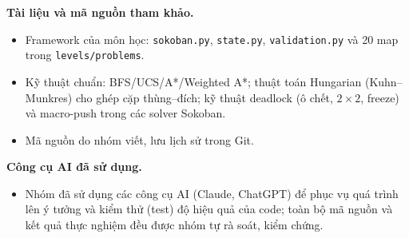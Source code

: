 \documentclass[a4paper,12pt]{article}
\begin{document}
\textbf{Tài liệu và mã nguồn tham khảo.}
\begin{itemize}
    \item Framework của môn học: \texttt{sokoban.py}, \texttt{state.py}, \texttt{validation.py} và 20 map trong \texttt{levels/problems}.
    \item Kỹ thuật chuẩn: BFS/UCS/A*/Weighted A*; thuật toán Hungarian (Kuhn--Munkres) cho ghép cặp thùng--đích; kỹ thuật deadlock (ô chết, $2\times 2$, freeze) và macro-push trong các solver Sokoban.
    \item Mã nguồn do nhóm viết, lưu lịch sử trong Git.
\end{itemize}

\textbf{Công cụ AI đã sử dụng.}
\begin{itemize}
   \item Nhóm đã sử dụng các công cụ AI (Claude, ChatGPT) để phục vụ quá trình lên ý tưởng và kiểm thử (test) độ hiệu quả của code; toàn bộ mã nguồn và kết quả thực nghiệm đều được nhóm tự rà soát, kiểm chứng.
\end{itemize}
\end{document}
